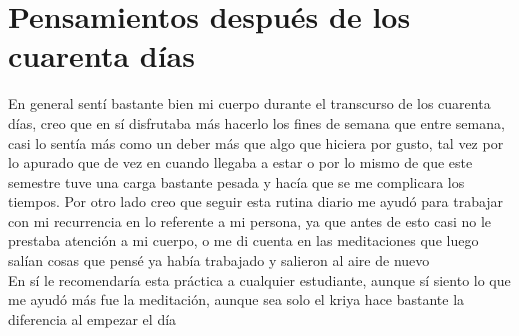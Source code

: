 \documentclass[11pt]{report}
\theoremstyle{plain}
\theoremstyle{definition}
\begin{document}
\chapter{Pensamientos después de los cuarenta días}
	En general sentí bastante bien mi cuerpo durante el transcurso de los cuarenta días, creo que en sí disfrutaba más hacerlo los fines de semana que entre semana, casi lo sentía más como un deber más que algo que hiciera por gusto, tal vez por lo apurado que de vez en cuando llegaba a estar o por lo mismo de que este semestre tuve una carga bastante pesada y hacía que se me complicara los tiempos. Por otro lado creo que seguir esta rutina diario me ayudó para trabajar con mi recurrencia en lo referente a mi persona, ya que antes de esto casi no le prestaba atención a mi cuerpo, o me di cuenta en las meditaciones que luego salían cosas que pensé ya había trabajado y salieron al aire de nuevo\\

	En sí le recomendaría esta práctica a cualquier estudiante, aunque sí siento lo que me ayudó más fue la meditación, aunque sea solo el kriya hace bastante la diferencia al empezar el día
\end{document}
